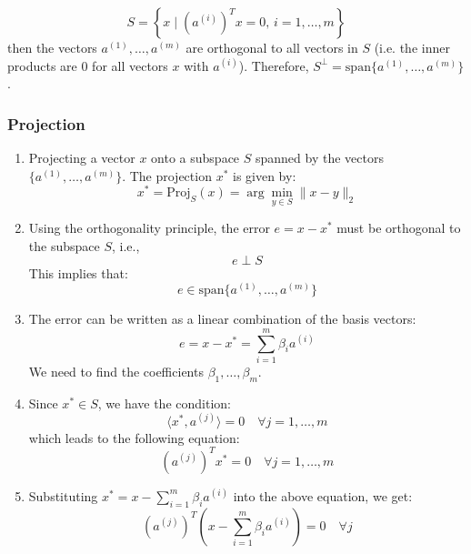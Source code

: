     \begin{definition}
        \begin{equation*}
            S = \left\{ x \mid \left( a^{(i)} \right)^T x = 0, \, i = 1, \dots, m \right\}
        \end{equation*}
        then the vectors \( a^{(1)}, \dots, a^{(m)} \) are orthogonal to all vectors in \( S \) (i.e. the inner products are $0$ for all vectors $x$ with $a^{(i)}$). Therefore, $S^\perp = \text{span} \{ a^{(1)}, \dots, a^{(m)} \}$.
    \end{definition}

    \subsubsection{Projection}
    \begin{derivation}
        \begin{enumerate}
            \item Projecting a vector $x$ onto a subspace $S$ spanned by the vectors $\{a^{(1)}, \dots, a^{(m)}\}$. 
            The projection $x^*$ is given by:
            \[
            x^* = \text{Proj}_S(x) = \arg \min_{y \in S} \| x - y \|_2
            \]

            \item Using the orthogonality principle, the error $e = x - x^*$ must be orthogonal to the subspace $S$, i.e.,
            \[
            e \perp S
            \]
            This implies that:
            \[
            e \in \text{span}\{a^{(1)}, \dots, a^{(m)}\}
            \]
            
            \item The error can be written as a linear combination of the basis vectors:
            \[
            e = x - x^* = \sum_{i=1}^{m} \beta_i a^{(i)}
            \]
            We need to find the coefficients $\beta_1, \dots, \beta_m$.
            
            \item Since $x^* \in S$, we have the condition:
            \[
            \langle x^*, a^{(j)} \rangle = 0 \quad \forall j = 1, \dots, m
            \]
            which leads to the following equation:
            \[
            (a^{(j)})^T x^* = 0 \quad \forall j = 1, \dots, m
            \]
            
            \item Substituting $x^* = x - \sum_{i=1}^{m} \beta_i a^{(i)}$ into the above equation, we get:
            \[
            (a^{(j)})^T \left( x - \sum_{i=1}^{m} \beta_i a^{(i)} \right) = 0 \quad \forall j
            \]
            

\end{enumerate}
\end{derivation}
